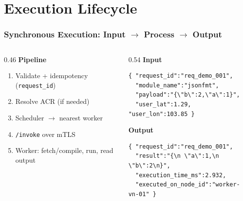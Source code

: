 \documentclass[11pt, aspectratio=169]{beamer}
\begin{document}
\section{Execution Lifecycle}

\begin{frame}[fragile]
	\frametitle{Synchronous Execution: Input $\rightarrow$ Process $\rightarrow$ Output}
	\begin{columns}[t]
		\begin{column}{0.46\textwidth}
			\textbf{Pipeline}
			\begin{enumerate}
				\item Validate + idempotency (\texttt{request\_id})
				\item Resolve ACR (if needed)
				\item Scheduler $\rightarrow$ nearest worker
				\item \texttt{/invoke} over mTLS
				\item Worker: fetch/compile, run, read output
			\end{enumerate}
		\end{column}
		\begin{column}{0.54\textwidth}
			\textbf{Input}
\begin{lstlisting}
{ "request_id":"req_demo_001",
  "module_name":"jsonfmt",
  "payload":"{\"b\":2,\"a\":1}",
  "user_lat":1.29, "user_lon":103.85 }
\end{lstlisting}
			\textbf{Output}
\begin{lstlisting}
{ "request_id":"req_demo_001",
  "result":"{\n \"a\":1,\n \"b\":2\n}",
  "execution_time_ms":2.932,
  "executed_on_node_id":"worker-vn-01" }
\end{lstlisting}
		\end{column}
	\end{columns}
\end{frame}
\end{document}
